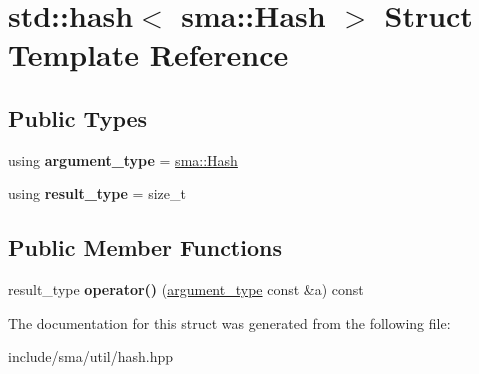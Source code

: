 \hypertarget{structstd_1_1hash_3_01sma_1_1Hash_01_4}{\section{std\-:\-:hash$<$ sma\-:\-:Hash $>$ Struct Template Reference}
\label{structstd_1_1hash_3_01sma_1_1Hash_01_4}
}
\subsection*{Public Types}
\begin{DoxyCompactItemize}
\item 
\hypertarget{structstd_1_1hash_3_01sma_1_1Hash_01_4_ac19ac5fa9d7134e6cae9b75a2b3f4c73}{using {\bfseries argument\-\_\-type} = \hyperlink{structsma_1_1Hash}{sma\-::\-Hash}}\label{structstd_1_1hash_3_01sma_1_1Hash_01_4_ac19ac5fa9d7134e6cae9b75a2b3f4c73}

\item 
\hypertarget{structstd_1_1hash_3_01sma_1_1Hash_01_4_aec7fbba93db28c8c3f833b4042f109b3}{using {\bfseries result\-\_\-type} = size\-\_\-t}\label{structstd_1_1hash_3_01sma_1_1Hash_01_4_aec7fbba93db28c8c3f833b4042f109b3}

\end{DoxyCompactItemize}
\subsection*{Public Member Functions}
\begin{DoxyCompactItemize}
\item 
\hypertarget{structstd_1_1hash_3_01sma_1_1Hash_01_4_a87f796dbb840c3f99fcae9548962406f}{result\-\_\-type {\bfseries operator()} (\hyperlink{structsma_1_1Hash}{argument\-\_\-type} const \&a) const }\label{structstd_1_1hash_3_01sma_1_1Hash_01_4_a87f796dbb840c3f99fcae9548962406f}

\end{DoxyCompactItemize}


The documentation for this struct was generated from the following file\-:\begin{DoxyCompactItemize}
\item 
include/sma/util/hash.\-hpp\end{DoxyCompactItemize}

